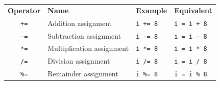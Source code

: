 \begin{center}
  \begin{tabular}{clll}
    \textbf{Operator} & \textbf{Name} & \textbf{Example} & \textbf{Equivalent} \\
    \texttt{+=}  & Addition assignment       & \texttt{i += 8}  & \texttt{i = i + 8} \\
    \texttt{-=}  & Subtraction assignment    & \texttt{i -= 8}  & \texttt{i = i - 8}  \\
    \texttt{*=}  & Multiplication assignment & \texttt{i *= 8}  & \texttt{i = i * 8}  \\
    \texttt{/=}  & Division assignment       & \texttt{i /= 8}  & \texttt{i = i / 8}  \\
    \texttt{\%=} & Remainder assignment      & \texttt{i \%= 8} & \texttt{i = i \% 8}  \\
  \end{tabular}
\end{center}
